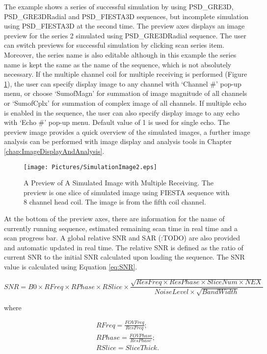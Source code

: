 \documentclass{book}%
\begin{document}
The example shows a series of successful simulation by using PSD\_GRE3D, PSD\_GRE3DRadial and PSD\_FIESTA3D sequences, but incomplete simulation using PSD\_FIESTA3D at the second time. The preview axes displays an image preview for the series 2 simulated using PSD\_GRE3DRadial sequence. The user can switch previews for successful simulation by clicking scan series item. Moreover, the series name is also editable although in this example the series name is kept the same as the name of the sequence, which is not absolutely necessary. If the multiple channel coil for multiple receiving is performed (Figure \ref{fig:SimulationImage2}), the user can specify display image to any channel with `Channel \#' pop-up menu, or choose `SumofMagn' for summation of image magnitude of all channels or `SumofCplx' for summation of complex image of all channels. If multiple echo is enabled in the sequence, the user can also specify display image to any echo with `Echo \#' pop-up menu. Default value of 1 is used for single echo. The preview image provides a quick overview of the simulated images, a further image analysis can be performed with image display and analysis tools in Chapter \ref{chap:ImageDisplayAndAnalysis}.

\begin{figure}[htbp]
	\centering
		\texttt{[image: Pictures/SimulationImage2.eps]}
	\caption{A Preview of A Simulated Image with Multiple Receiving. The preview is one slice of simulated image using FIESTA sequence with 8 channel head coil. The image is from the fifth coil channel.}
	\label{fig:SimulationImage2}
\end{figure}

At the bottom of the preview axes, there are information for the name of currently running sequence, estimated remaining scan time in real time and a scan progress bar. A global relative SNR and SAR (:TODO) are also provided and automatic updated in real time. The relative SNR is defined as the ratio of current SNR to the initial SNR calculated upon loading the sequence. The SNR value is calculated using Equation \ref{eq:SNR}.

\begin{equation}
SNR = B0 \times RFreq \times RPhase \times RSlice \times \frac{\sqrt{ResFreq \times ResPhase \times SliceNum \times NEX}}{NoiseLevel \times \sqrt{BandWidth}}
\label{eq:SNR}
\end{equation}

where

\begin{equation}
\begin{aligned}
	RFreq  = \frac{FOVFreq}{ResFreq}; \\
	RPhase = \frac{FOVPhase}{ResPhase}; \\
	RSlice = SliceThick. \\
\label{eq:SNR2}
\end{aligned}
\end{equation}
\end{document}
